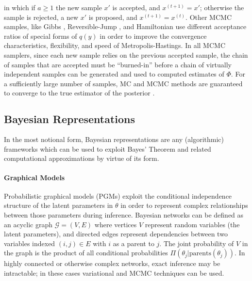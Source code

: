 \noindent in which if $a \geq 1$ the new sample $x'$ is accepted, and $x^{(t+1)} = x'$; otherwise the sample is rejected, a new $x'$ is proposed, and $x^{(t+1)} = x^{(t)}$. Other MCMC samples, like Gibbs \autocite{mackay1998introduction}, Reversible-Jump \autocite{green1995reversible}, and Hamiltonian \autocite{neal2011mcmc} use different acceptance ratios of special forms of $q(y)$ in order to improve the convergence characteristics, flexibility, and speed of Metropolis-Hastings.
In all MCMC samplers, since each new sample relies on the previous accepted sample, the chain of samples that are accepted must be ``burned-in'' before a chain of virtually independent samples can be generated and used to computed estimates of $\Phi$. For a sufficiently large number of samples, MC and MCMC methods are guaranteed to converge to the true estimator of the posterior \autocite{mackay1998introduction}.


\subsection{Bayesian Representations}
In the most notional form, Bayesian representations are any (algorithmic) frameworks which can be used to exploit Bayes' Theorem and related computational approximations by virtue of its form.

\paragraph{Graphical Models}
Probabilistic graphical models (PGMs) exploit the conditional independence structure of the latent parameters in $\theta$ in order to represent complex relationships between those parameters during inference. Bayesian networks \autocite{ghahramani2001introduction,aguilera2011bayesian,Arora2017} can be defined as an acyclic graph $\mathcal{G} = (V, E)$ where vertices $V$ represent random variables (the latent parameters), and directed edges represent dependencies between two variables indexed $(i, j) \in E$ with $i$ as a parent to $j$. The joint probability of $V$ in the graph is the product of all conditional probabilities $\Pi(\theta_j | \text{parents}(\theta_j))$. In highly connected or otherwise complex networks, exact inference may be intractable; in these cases variational and MCMC techniques can be used. 

